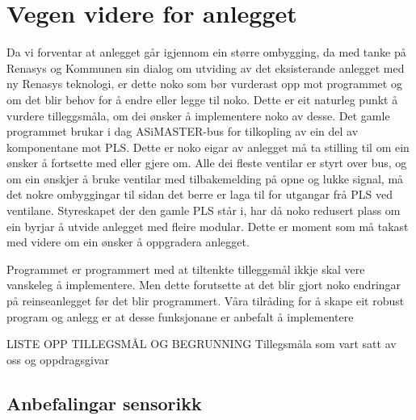 \section{Vegen videre for anlegget}
\thispagestyle{fancy}



Da vi forventar at anlegget går igjennom ein større ombygging, da med tanke på Renasys og Kommunen sin dialog om utviding av det eksisterande anlegget med ny Renasys teknologi, er dette noko som bør vurderast opp mot programmet og om det blir behov for å endre eller legge til noko. 
Dette er eit naturleg punkt å vurdere tilleggsmåla, om dei ønsker å implementere noko av desse.
Det gamle programmet brukar i dag ASiMASTER-bus for tilkopling av ein del av komponentane mot PLS. 
Dette er noko eigar av anlegget må ta stilling til om ein ønsker å fortsette med eller gjere om. Alle dei fleste ventilar er styrt over bus, og om ein ønskjer å bruke ventilar med tilbakemelding på opne og lukke signal, må det nokre ombyggingar til sidan det berre er laga til for utgangar frå PLS ved ventilane.
Styreskapet der den gamle PLS står i, har då noko redusert plass om ein byrjar å utvide anlegget med fleire modular. 
Dette er moment som må takast med videre om ein ønsker å oppgradera anlegget. 

Programmet er programmert med at tiltenkte tilleggsmål ikkje skal vere vanskeleg å implementere. 
Men dette forutsette at det blir gjort noko endringar på reinseanlegget før det blir programmert. 
Våra tilråding for å skape eit robust program og anlegg er at desse funksjonane er anbefalt å implementere

LISTE OPP TILLEGSMÅL OG BEGRUNNING
Tillegsmåla som vart satt av oss og oppdragsgivar

\subsection{Anbefalingar sensorikk}






\newpage

